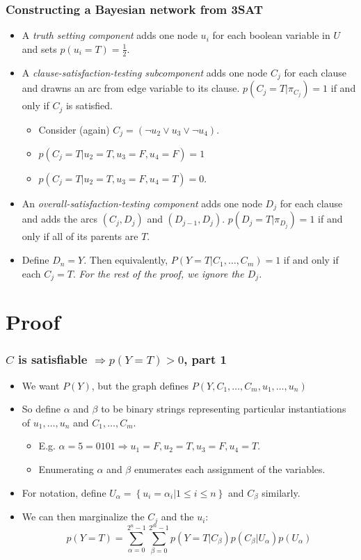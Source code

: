 \documentclass{beamer}
\begin{document}
\begin{frame}
\frametitle{Constructing a Bayesian network from 3SAT}
\begin{itemize}
  \item A \emph{truth setting component} adds one node $u_i$ for each boolean variable in $U$ and sets $p(u_i = T) = \frac{1}{2}$.
  \item A \emph{clause-satisfaction-testing subcomponent} adds one node $C_j$ for each clause and drawns an arc from edge variable to its clause. $p(C_j = T | \pi_{C_j}) = 1$ if and only if $C_j$ is satisfied.
  \begin{itemize}
    \item Consider (again) $C_j = (\neg u_2 \lor u_3 \lor \neg u_4)$.
    \item $p(C_j = T | u_2 = T, u_3 = F, u_4 = F) = 1$
    \item $p(C_j = T | u_2 = T, u_3 = F, u_4 = T) = 0$.
  \end{itemize}
  \item An \emph{overall-satisfaction-testing component} adds one node $D_j$ for each clause and adds the arcs $(C_j, D_j)$ and $(D_{j-1}, D_j)$. $p(D_j = T | \pi_{D_j}) = 1$ if and only if all of its parents are $T$.
  \item Define $D_n = Y$. Then equivalently, $P(Y = T | C_1, \ldots, C_m) = 1$ if and only if each $C_j = T$. \emph{For the rest of the proof, we ignore the $D_j$.}
\end{itemize}
\end{frame}

\section{Proof}
\begin{frame}
\frametitle{$C$ is satisfiable $\Rightarrow p(Y = T) > 0$, part 1}
\begin{itemize}
  \item We want $P(Y)$, but the graph defines $P(Y, C_1, \ldots, C_m, u_1, \ldots, u_n)$
  \item So define $\alpha$ and $\beta$ to be binary strings representing particular instantiations of $u_1, \ldots, u_n$ and $C_1, \ldots, C_m$. 
  \begin{itemize}
    \item E.g. $\alpha = 5 = 0101 \Rightarrow u_1 = F, u_2 = T, u_3 = F, u_4 = T$.
    \item Enumerating $\alpha$ and $\beta$ enumerates each assignment of the variables.
  \end{itemize}
  \item For notation, define $U_{\alpha} = \left\{ u_i = \alpha_{i} | 1 \leq i \leq n \right\}$ and $C_{\beta}$ similarly.
  \item We can then marginalize the $C_j$ and the $u_i$: $$p(Y = T) = \sum_{\alpha = 0}^{2^n - 1} \sum_{\beta = 0}^{2^m - 1} p(Y = T | C_{\beta}) p(C_{\beta} | U_{\alpha}) p(U_{\alpha})$$
\end{itemize}
\end{frame}
\end{document}
